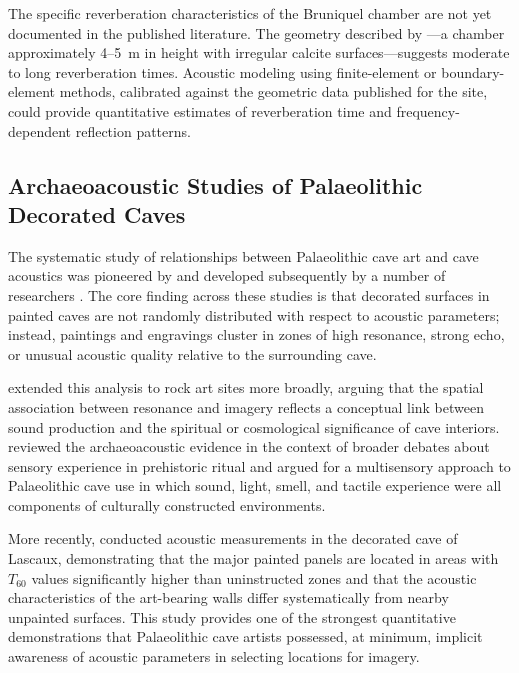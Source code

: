 \documentclass[12pt]{article}
\begin{document}
The specific reverberation characteristics of the Bruniquel chamber are not yet documented in the published literature. The geometry described by \citet{Jaubert2016}—a chamber approximately 4--5~m in height with irregular calcite surfaces—suggests moderate to long reverberation times. Acoustic modeling using finite-element or boundary-element methods, calibrated against the geometric data published for the site, could provide quantitative estimates of reverberation time and frequency-dependent reflection patterns.

\subsection{Archaeoacoustic Studies of Palaeolithic Decorated Caves}

The systematic study of relationships between Palaeolithic cave art and cave acoustics was pioneered by \citet{Reznikoff1988} and developed subsequently by a number of researchers \citep{Waller1993, Dauvois1994, Scarre2006, Fazenda2017}. The core finding across these studies is that decorated surfaces in painted caves are not randomly distributed with respect to acoustic parameters; instead, paintings and engravings cluster in zones of high resonance, strong echo, or unusual acoustic quality relative to the surrounding cave.

\citet{Waller1993} extended this analysis to rock art sites more broadly, arguing that the spatial association between resonance and imagery reflects a conceptual link between sound production and the spiritual or cosmological significance of cave interiors. \citet{Scarre2006} reviewed the archaeoacoustic evidence in the context of broader debates about sensory experience in prehistoric ritual and argued for a multisensory approach to Palaeolithic cave use in which sound, light, smell, and tactile experience were all components of culturally constructed environments.

More recently, \citet{Fazenda2017} conducted acoustic measurements in the decorated cave of Lascaux, demonstrating that the major painted panels are located in areas with $T_{60}$ values significantly higher than uninstructed zones and that the acoustic characteristics of the art-bearing walls differ systematically from nearby unpainted surfaces. This study provides one of the strongest quantitative demonstrations that Palaeolithic cave artists possessed, at minimum, implicit awareness of acoustic parameters in selecting locations for imagery.
\end{document}
